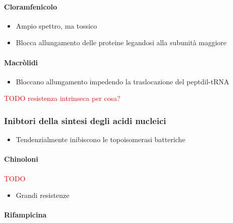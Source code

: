 \documentclass[italian,]{article}
\providecommand{\tightlist}{%
  \setlength{\itemsep}{0pt}\setlength{\parskip}{0pt}}
\newcommand{\TODO}[1]{\textcolor{red}{\textsf{\footnotesize{TODO #1}}}} %
\begin{document}
\hypertarget{cloramfenicolo}{%
\paragraph{Cloramfenicolo}\label{cloramfenicolo}}

\begin{itemize}
\tightlist
\item
  Ampio spettro, ma tossico
\item
  Blocca allungamento delle proteine legandosi alla subunità maggiore
\end{itemize}

\hypertarget{macruxf2lidi}{%
\paragraph{Macròlidi}\label{macruxf2lidi}}

\begin{itemize}
\tightlist
\item
  Bloccano allungamento impedendo la traslocazione del peptdil-tRNA
\end{itemize}

\TODO{resistenza intrinseca per cosa?}

\hypertarget{inibtori-della-sintesi-degli-acidi-nucleici}{%
\subsubsection{Inibtori della sintesi degli acidi
nucleici}\label{inibtori-della-sintesi-degli-acidi-nucleici}}

\begin{itemize}
\tightlist
\item
  Tendenzialmente inibiscono le topoisomerasi batteriche
\end{itemize}

\hypertarget{chinoloni}{%
\paragraph{Chinoloni}\label{chinoloni}}

\TODO{}

\begin{itemize}
\tightlist
\item
  Grandi resistenze
\end{itemize}

\hypertarget{rifampicina}{%
\paragraph{Rifampicina}\label{rifampicina}}
\end{document}
